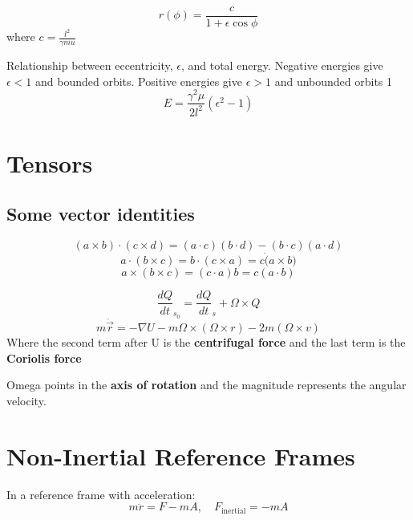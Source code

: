 \begin{equation}
	\label{}
	r(\phi)=\frac{c}{1+\epsilon\cos{\phi}}
\end{equation}
where $c=\frac{l^{2}}{\gamma mu}$


\hfill
Relationship between eccentricity, $\epsilon$, and total energy. Negative energies give $\epsilon<1$ and bounded orbits. Positive energies give $\epsilon>1$ and unbounded orbits 1
\begin{equation}
	\label{}
	E=\frac{\gamma^{2}\mu}{2l^{2}}(\epsilon^{2}-1)
\end{equation}



\section{Tensors}
\subsection{Some vector identities}

\begin{equation}
	\label{}
	(a \times  b)\cdot (c \times d)=(a\cdot c)(b\cdot d)-(b\cdot c)(a\cdot d)
\end{equation}
\begin{equation}
	\label{}
	a\cdot(b \times c)=b\cdot(c \times a)=c\dot(a \times b)
\end{equation}
\begin{equation}
	\label{}
	a \times (b \times c)=(c\cdot a)b=c(a\cdot b)
\end{equation}

\begin{equation}
	\label{}
	\frac{dQ}{dt}_{s_{0}}=\frac{dQ}{dt}_{s}+\Omega \times Q
\end{equation}
\begin{equation}
	\label{}
	m\ddot{\vec{r}}=-\nabla U - m \Omega \times (\Omega \times r)-2m(\Omega \times v)
\end{equation}
Where the second term after U is the \textbf{centrifugal force} and the last term is the \textbf{Coriolis force}

Omega points in the \textbf{axis of rotation} and the magnitude represents the angular velocity.

\section{Non-Inertial Reference Frames}
In a reference frame with acceleration:
\begin{equation}
	\label{}
	m\ddot{r}=F-mA,\quad F_{\mbox{inertial}}=-mA
\end{equation}

